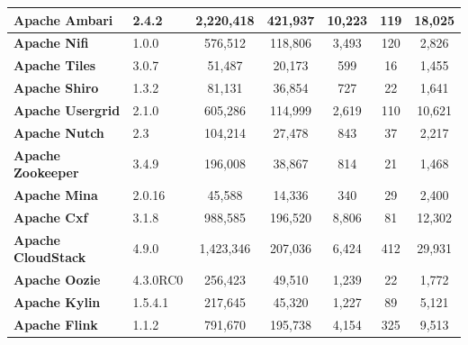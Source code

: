 \begin{landscape}
\begin{table}[htbp]
\begin{adjustbox}{width=1.3\textwidth}
\begin{tabular}{l|l|c|c|c|c|c}
				\textbf{Apache Ambari}     & ‎2.4.2           & 2,220,418                   &          421,937           &       10,223       &          119           &        18,025        \\ \hline
				\textbf{Apache Nifi}       & 1.0.0            & 576,512                    &          118,806           &       3,493        &          120           &        2,826         \\ \hline
				\textbf{Apache Tiles}      & 3.0.7            & 51,487                     &           20,173           &        599        &           16           &        1,455         \\ \hline
				\textbf{Apache Shiro}      & ‎1.3.2           & 81,131                     &           36,854           &        727        &           22           &        1,641         \\ \hline
				\textbf{Apache Usergrid}   & 2.1.0            & 605,286                    &          114,999           &       2,619        &          110           &        10,621        \\ \hline
				\textbf{Apache Nutch}      & 2.3              & 104,214                    &           27,478           &        843        &           37           &        2,217         \\ \hline
				\textbf{Apache Zookeeper}  & 3.4.9            & 196,008                    &           38,867           &        814        &           21           &        1,468         \\ \hline
				\textbf{Apache Mina}       & 2.0.16           & 45,588                     &           14,336           &        340        &           29           &        2,400         \\ \hline
				\textbf{Apache Cxf}        & 3.1.8            & 988,585                    &          196,520           &       8,806        &           81           &        12,302        \\ \hline
				\textbf{Apache CloudStack} & 4.9.0            & 1,423,346                   &          207,036           &       6,424        &          412           &        29,931        \\ \hline
				\textbf{Apache Oozie}      & 4.3.0RC0         & 256,423                    &           49,510           &       1,239        &           22           &        1,772         \\ \hline
				\textbf{Apache Kylin}      & 1.5.4.1          & 217,645                    &           45,320           &       1,227        &           89           &        5,121         \\ \hline
				\textbf{Apache Flink}      & 1.1.2            & 791,670                    &          195,738           &       4,154        &          325           &        9,513         \\ \hline
			\end{tabular}
			\label{table:ch4_projects_statistics_2}
			

\end{adjustbox}
\end{table}
\end{landscape}
